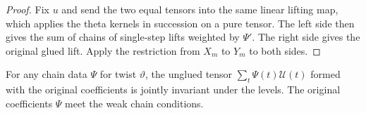 \begin{proof}
Fix $u$ and send the two equal tensors into the same linear lifting map, which applies the theta kernels in succession on a pure tensor. The left side then gives the sum of chains of single-step lifts weighted by $\Psi'$. The right side gives the original glued lift. Apply the restriction from $X_m$ to $Y_m$ to both sides.
\end{proof}

\begin{lemma}
\label{lem:a-weak-chain-vacuum-projection}
\emitthmsource
For any chain data $\Psi$ for twist $\vartheta$, the unglued tensor $\sum_t\Psi(t)\mathcal U(t)$ formed with the original coefficients is jointly invariant under the levels. The original coefficients $\Psi$ meet the weak chain conditions.
\end{lemma}
